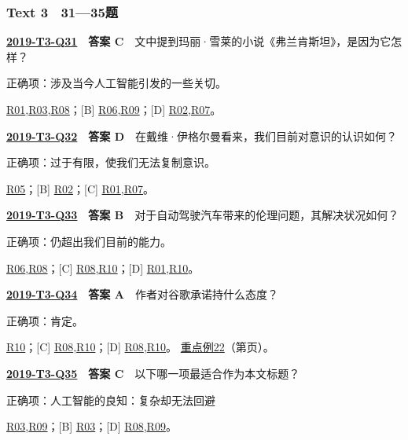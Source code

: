 \documentclass[11pt,a4paper]{article}
\begin{document}
\subsubsection{Text 3　31—35题}
\label{idx-2019-T3-Q31}
\noindent\textbf{\href{https://zj139.github.io/math-notes/english/e628c563c6583f6521f56489/\#q31}{2019-T3-Q31}　答案 C}　文中提到玛丽·雪莱的小说《弗兰肯斯坦》，是因为它怎样？\par\nopagebreak
\noindent 正确项：涉及当今人工智能引发的一些关切。\par\nopagebreak
\noindent [A] \hyperref[cat-R01]{R01},\hyperref[cat-R03]{R03},\hyperref[cat-R08]{R08}；[B] \hyperref[cat-R06]{R06},\hyperref[cat-R09]{R09}；[D] \hyperref[cat-R02]{R02},\hyperref[cat-R07]{R07}。
\par\smallskip
{}\label{idx-2019-T3-Q32}
\noindent\textbf{\href{https://zj139.github.io/math-notes/english/e628c563c6583f6521f56489/\#q32}{2019-T3-Q32}　答案 D}　在戴维·伊格尔曼看来，我们目前对意识的认识如何？\par\nopagebreak
\noindent 正确项：过于有限，使我们无法复制意识。\par\nopagebreak
\noindent [A] \hyperref[cat-R05]{R05}；[B] \hyperref[cat-R02]{R02}；[C] \hyperref[cat-R01]{R01},\hyperref[cat-R07]{R07}。
\par\smallskip
{}\label{idx-2019-T3-Q33}
\noindent\textbf{\href{https://zj139.github.io/math-notes/english/e628c563c6583f6521f56489/\#q33}{2019-T3-Q33}　答案 B}　对于自动驾驶汽车带来的伦理问题，其解决状况如何？\par\nopagebreak
\noindent 正确项：仍超出我们目前的能力。\par\nopagebreak
\noindent [A] \hyperref[cat-R06]{R06},\hyperref[cat-R08]{R08}；[C] \hyperref[cat-R08]{R08},\hyperref[cat-R10]{R10}；[D] \hyperref[cat-R01]{R01},\hyperref[cat-R10]{R10}。
\par\smallskip
{}\label{idx-2019-T3-Q34}
\noindent\textbf{\href{https://zj139.github.io/math-notes/english/e628c563c6583f6521f56489/\#q34}{2019-T3-Q34}　答案 A}　作者对谷歌承诺持什么态度？\par\nopagebreak
\noindent 正确项：肯定。\par\nopagebreak
\noindent [B] \hyperref[cat-R10]{R10}；[C] \hyperref[cat-R08]{R08},\hyperref[cat-R10]{R10}；[D] \hyperref[cat-R08]{R08},\hyperref[cat-R10]{R10}。
\hyperref[case-2019-T3-Q34]{重点例22}（第\pageref{case-2019-T3-Q34}页）。
\par\smallskip
{}\label{idx-2019-T3-Q35}
\noindent\textbf{\href{https://zj139.github.io/math-notes/english/e628c563c6583f6521f56489/\#q35}{2019-T3-Q35}　答案 C}　以下哪一项最适合作为本文标题？\par\nopagebreak
\noindent 正确项：人工智能的良知：复杂却无法回避\par\nopagebreak
\noindent [A] \hyperref[cat-R03]{R03},\hyperref[cat-R09]{R09}；[B] \hyperref[cat-R03]{R03}；[D] \hyperref[cat-R08]{R08},\hyperref[cat-R09]{R09}。
\par\smallskip
\end{document}
